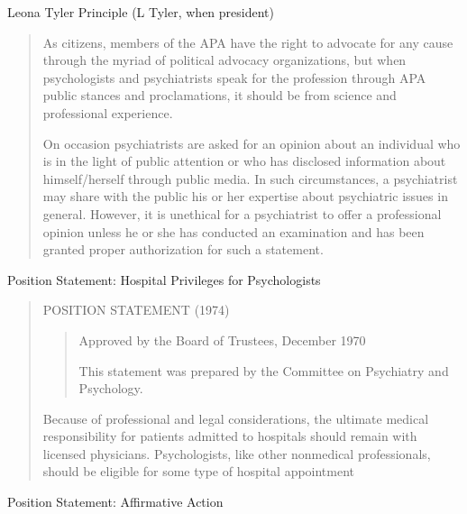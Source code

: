\begin{refsection}
\begin{apatextbox}{Leona Tyler Principle (L Tyler, when president)}

\begin{quote}

As citizens, members of the APA have the right to advocate for any cause through the myriad of political advocacy organizations, but when psychologists and psychiatrists speak for the profession through APA public stances and proclamations, it should be from science and professional experience. 

On occasion psychiatrists are asked for an opinion about an individual who is in the light of public attention or who has disclosed information about himself\slash herself through public media. In such circumstances, a psychiatrist may share with the public his or her expertise about psychiatric issues in general. However, it is unethical for a psychiatrist to offer a professional opinion unless he or she has conducted an examination and has been granted proper authorization for such a statement.
\end{quote}

\label{leonatylerprinciple}
\end{apatextbox}

\begin{apatextbox}{Position Statement: Hospital Privileges for Psychologists}

\begin{quote}

POSITION STATEMENT (1974)

\begin{quote}

Approved by the Board of Trustees, December 1970

This statement was prepared by the Committee on Psychiatry and Psychology.
\end{quote}

Because of professional and legal considerations, the ultimate medical responsibility for patients admitted to hospitals should remain with licensed physicians. Psychologists, like other nonmedical professionals, should be eligible for some type of hospital appointment
\end{quote}

\label{hospitalprivledges} \end{apatextbox}

\begin{apatextbox}{Position Statement: Affirmative Action}


\end{apatextbox}
\end{refsection}
